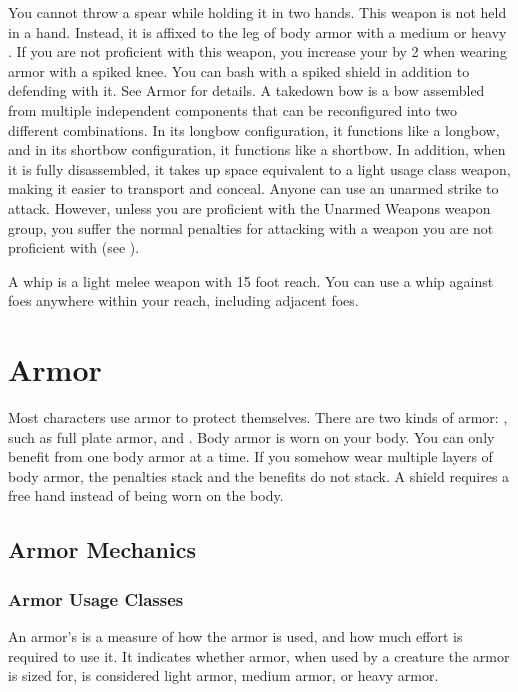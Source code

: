          You cannot throw a spear while holding it in two hands.
         This weapon is not held in a hand.
        Instead, it is affixed to the leg of body armor with a medium or heavy .
        If you are not proficient with this weapon, you increase your  by 2 when wearing armor with a spiked knee.
         You can bash with a spiked shield in addition to defending with it. See Armor for details.
         A takedown bow is a bow assembled from multiple independent components that can be reconfigured into two different combinations.
        In its longbow configuration, it functions like a longbow, and in its shortbow configuration, it functions like a shortbow.
        In addition, when it is fully disassembled, it takes up space equivalent to a light usage class weapon, making it easier to transport and conceal.
         Anyone can use an unarmed strike to attack.
        However, unless you are proficient with the Unarmed Weapons weapon group, you suffer the normal penalties for attacking with a weapon you are not proficient with (see ).

         A whip is a light melee weapon with 15 foot reach.
        You can use a whip against foes anywhere within your reach, including adjacent foes.

\section{Armor}\label{Armor}

    Most characters use armor to protect themselves. There are two kinds of armor: , such as full plate armor, and .
    Body armor is worn on your body.
    You can only benefit from one body armor at a time.
    If you somehow wear multiple layers of body armor, the penalties stack and the benefits do not stack.
    A shield requires a free hand instead of being worn on the body.

    \subsection{Armor Mechanics}

        \subsubsection{Armor Usage Classes}\label{Armor Usage Classes}
            An armor's  is a measure of how the armor is used, and how much effort is required to use it.
            It indicates whether armor, when used by a creature the armor is sized for, is considered light armor, medium armor, or heavy armor.

